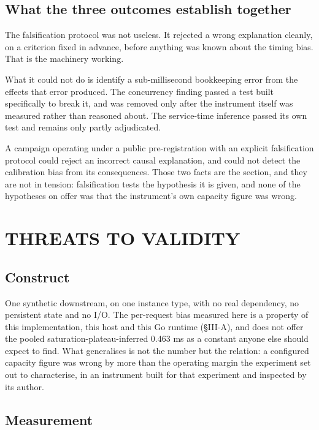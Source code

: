 \documentclass{ieeeaccess}
\begin{document}
\subsection{What the three outcomes establish together}

The falsification protocol was not useless. It rejected a wrong explanation cleanly, on a criterion fixed in advance, before anything was known about the timing bias. That is the machinery working.

What it could not do is identify a sub-millisecond bookkeeping error from the effects that error produced. The concurrency finding passed a test built specifically to break it, and was removed only after the instrument itself was measured rather than reasoned about. The service-time inference passed its own test and remains only partly adjudicated.

A campaign operating under a public pre-registration with an explicit falsification protocol could reject an incorrect causal explanation, and could not detect the calibration bias from its consequences. Those two facts are the section, and they are not in tension: falsification tests the hypothesis it is given, and none of the hypotheses on offer was that the instrument's own capacity figure was wrong.

\section{THREATS TO VALIDITY}

\subsection{Construct}

One synthetic downstream, on one instance type, with no real dependency, no persistent state and no I/O. The per-request bias measured here is a property of this implementation, this host and this Go runtime (\S{}III-A), and does not offer the pooled saturation-plateau-inferred 0.463 ms as a constant anyone else should expect to find. What generalises is not the number but the relation: a configured capacity figure was wrong by more than the operating margin the experiment set out to characterise, in an instrument built for that experiment and inspected by its author.

\subsection{Measurement}
\end{document}

